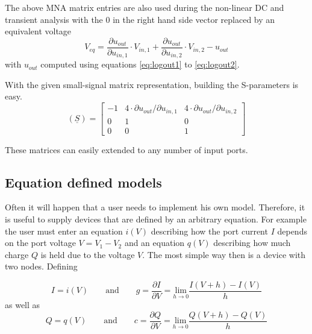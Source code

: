 The above MNA matrix entries are also used during the non-linear DC
and transient analysis with the 0 in the right hand side vector
replaced by an equivalent voltage
\begin{equation}
V_{eq} = \dfrac{\partial u_{out}}{\partial u_{in,1}}\cdot V_{in,1} +
         \dfrac{\partial u_{out}}{\partial u_{in,2}}\cdot V_{in,2} - u_{out}
\end{equation}
with $u_{out}$ computed using equations \eqref{eq:logout1} to
\eqref{eq:logout2}.

\addvspace{12pt}

With the given small-signal matrix representation, building the
S-parameters is easy.
\begin{equation}
(\underline{S}) =
\begin{bmatrix}
 -1 & 4\cdot\partial u_{out}/ \partial u_{in,1} & 4\cdot\partial u_{out}/ \partial u_{in,2} \\
 0  &  1 & 0\\
 0  &  0 &  1
\end{bmatrix}
\end{equation}

These matrices can easily extended to any number of input ports.

\subsection{Equation defined models}

Often it will happen that a user needs to implement his own model.
Therefore, it is useful to supply devices that are defined by an
arbitrary equation. For example the user must enter an equation $i(V)$
describing how the port current $I$ depends on the port voltage $V=V_1-V_2$
and an equation $q(V)$ describing how much charge $Q$ is held due to
the voltage $V$. The most simple way then is a device with two nodes.
Defining

\begin{equation}
I = i(V) \qquad\text{and}\qquad
    g = \dfrac{\partial I}{\partial V}
      = \underset{h\rightarrow 0}{\text{lim}}\dfrac{I(V+h) - I(V)}{h}
\end{equation}
as well as
\begin{equation}
Q = q(V) \qquad\text{and}\qquad
    c = \dfrac{\partial Q}{\partial V}
      = \underset{h\rightarrow 0}{\text{lim}}\dfrac{Q(V+h) - Q(V)}{h}
\end{equation}

